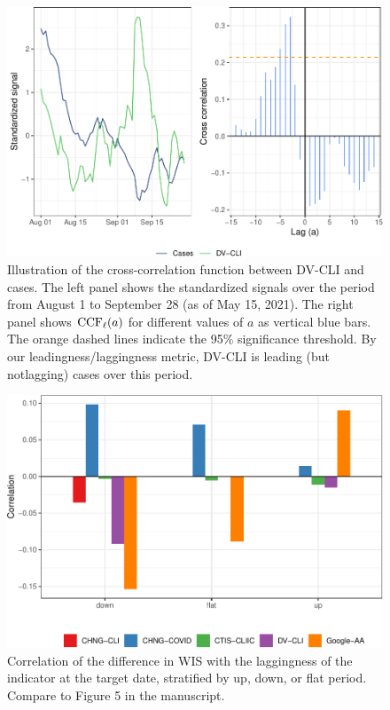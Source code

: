 \begin{figure}

{\centering \includegraphics[width=\textwidth]{fig/ccf-dv-finalized-1} 

}

\caption{Illustration of the cross-correlation function between DV-CLI and cases. The left panel shows the standardized signals over the period from August 1 to September 28 (as of May 15, 2021). The right panel shows $\mathrm{CCF}_{\ell}(a)$ for different values of $a$ as vertical blue bars. The orange dashed lines indicate the 95\% significance threshold. By our leadingness/laggingness metric, DV-CLI is leading (but notlagging) cases over this period.}\label{fig:ccf-dv-finalized}
\end{figure}

\clearpage

\begin{figure}

{\centering \includegraphics[width=\textwidth]{fig/lagging-only-1} 

}

\caption{Correlation of the difference in WIS with the  laggingness of the indicator at the target date, stratified by up, down, or flat period. Compare to Figure 5 in the manuscript.}\label{fig:lagging-only}
\end{figure}


